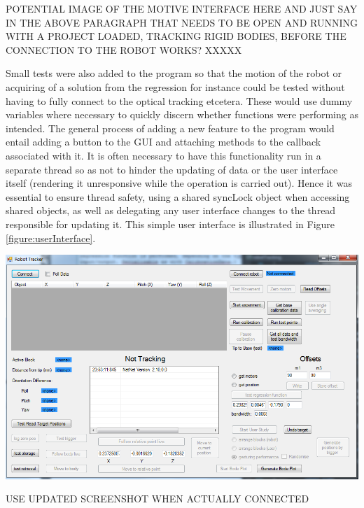 \documentclass[11pt]{article}
\begin{document}
POTENTIAL IMAGE OF THE MOTIVE INTERFACE HERE AND JUST SAY IN THE ABOVE PARAGRAPH THAT NEEDS TO BE OPEN AND RUNNING WITH A PROJECT LOADED, TRACKING RIGID BODIES, BEFORE THE CONNECTION TO THE ROBOT WORKS? XXXXX

Small tests were also added to the program so that the motion of the robot or acquiring of a solution from the regression for instance could be tested without having to fully connect to the optical tracking etcetera. These would use dummy variables where necessary to quickly discern whether functions were performing as intended. The general process of adding a new feature to the program would entail adding a button to the GUI and attaching methods to the callback associated with it. It is often necessary to have this functionality run in a separate thread so as not to hinder the updating of data or the user interface itself (rendering it unresponsive while the operation is carried out). Hence it was essential to ensure thread safety, using a shared syncLock object when accessing shared objects, as well as delegating any user interface changes to the thread responsible for updating it. This simple user interface is illustrated in Figure \ref{figure:userInterface}.

\begin{center}
\includegraphics[width=\textwidth]{images/userInterface.png}
\label{figure:userInterface}
\end{center}

USE UPDATED SCREENSHOT WHEN ACTUALLY CONNECTED
\end{document}
